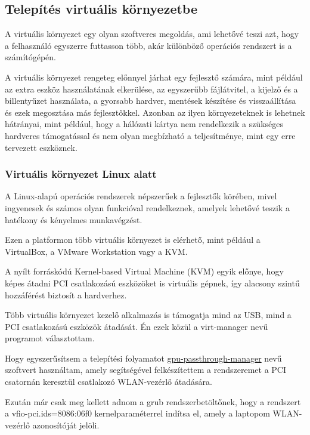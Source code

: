 \documentclass[12pt]{article}
\begin{document}
\subsection{Telepítés virtuális környezetbe}

A virtuális környezet egy olyan szoftveres megoldás, ami lehetővé teszi azt, hogy a felhasználó egyszerre futtasson több, akár különböző operációs rendszert is a számítógépén.

A virtuális környezet rengeteg előnnyel járhat egy fejlesztő számára, mint például az extra eszköz használatának elkerülése, az egyszerűbb fájlátvitel, a kijelző és a billentyűzet használata, a gyorsabb hardver, mentések készítése és visszaállítása és ezek megosztása más fejlesztőkkel. Azonban az ilyen környezeteknek is lehetnek hátrányai, mint például, hogy a hálózati kártya nem rendelkezik a szükséges hardveres támogatással és nem olyan megbízható a teljesítménye, mint egy erre tervezett eszköznek.

\subsubsection{Virtuális környezet Linux alatt}

A Linux-alapú operációs rendszerek népszerűek a fejlesztők körében, mivel ingyenesek és számos olyan funkcióval rendelkeznek, amelyek lehetővé teszik a hatékony és kényelmes munkavégzést.

Ezen a platformon több virtuális környezet is elérhető, mint például a VirtualBox, a VMware Workstation vagy a KVM.

A nyílt forráskódú Kernel-based Virtual Machine (KVM) egyik előnye, hogy képes
átadni PCI csatlakozású eszközöket is virtuális gépnek, így alacsony szintű hozzáférést biztosít a hardverhez. \cite{kvm} \cite{pci_passthrough}

Több virtuális környezet kezelő alkalmazás is támogatja mind az USB, mind a PCI csatlakozású eszközök átadását. Én ezek közül a virt-manager nevű programot választottam.


Hogy egyszerűsítsem a telepítési folyamatot \href{https://github.com/uwzis/gpu-passthrough-manager}{gpu-passthrough-manager} nevű szoftvert használtam, amely segítségével felkészítettem a rendszeremet a PCI csatornán keresztül csatlakozó WLAN-vezérlő átadására.

Ezután már csak meg kellett adnom a grub rendszerbetöltőnek, hogy a rendszert a vfio-pci.ids=8086:06f0 kernelparaméterrel indítsa el, amely a laptopom WLAN-vezérlő azonosítóját jelöli.
\end{document}
